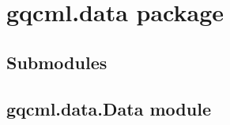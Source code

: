\documentclass[letterpaper,10pt,english]{sphinxmanual}
\begin{document}
\chapter{gqcml.data package}
\label{\detokenize{modules/gqcml.data:gqcml-data-package}}\label{\detokenize{modules/gqcml.data::doc}}

\section{Submodules}
\label{\detokenize{modules/gqcml.data:submodules}}

\section{gqcml.data.Data module}
\label{\detokenize{modules/gqcml.data:module-gqcml.data.Data}}\label{\detokenize{modules/gqcml.data:gqcml-data-data-module}}
\end{document}
